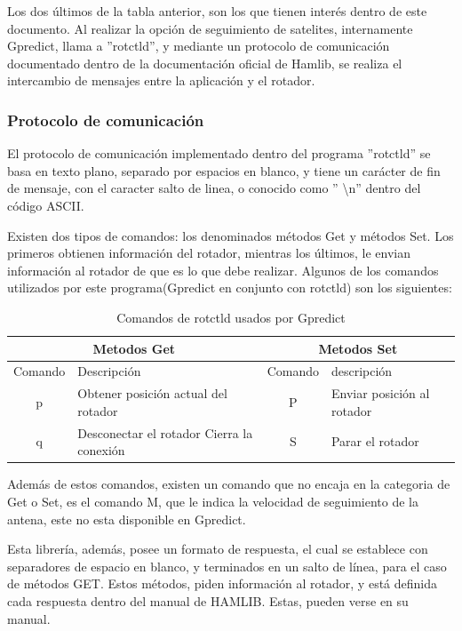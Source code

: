 Los dos últimos de la tabla anterior, son los que tienen interés dentro de este documento. Al realizar la opción de seguimiento de satelites, internamente Gpredict, llama a ''rotctld'', y mediante un protocolo de comunicación documentado dentro de la documentación oficial de Hamlib, se realiza el intercambio de mensajes entre la aplicación y el rotador. 

\subsubsection{Protocolo de comunicación} \label{subsub:protocol_com}
El protocolo de comunicación implementado dentro del programa ''rotctld'' se basa en texto plano, separado por espacios en blanco, y tiene un carácter de fin de mensaje, con el caracter salto de linea, o conocido como '' \textbackslash{}n'' dentro del código ASCII. 

Existen dos tipos de comandos: los denominados métodos Get y métodos Set. Los primeros obtienen información del rotador, mientras los últimos, le envian información al rotador de que es lo que debe realizar. Algunos de los comandos utilizados por este programa(Gpredict en conjunto con rotctld) son los siguientes: 

\begin{table}[H]
	\centering
	\begin{tabular}{|c|p{5cm}|c|p{5cm}|}
		\hline
		\multicolumn{2}{|c|}{Metodos Get}  &  \multicolumn{2}{|c|}{Metodos Set}  \\ 
		\hline
		Comando & Descripción & Comando & descripción	\\
		\hline
		p & Obtener posición actual del rotador  &P& Enviar posición al rotador \\
		\hline 
		q & Desconectar el rotador 	Cierra la conexión & S & Parar el rotador \\ 
		\hline 	
	\end{tabular}
	\caption{Comandos de rotctld usados por Gpredict} 
	\label{tab:commands_Gpredict}
\end{table}

Además de estos comandos, existen un comando que no encaja en la categoria de Get o Set, es el comando M, que le indica la velocidad de seguimiento de la antena, este no esta disponible en Gpredict. 

Esta librería, además, posee un formato de respuesta, el cual se establece con separadores de espacio en blanco, y terminados en un salto de línea, para el caso de métodos GET. Estos métodos, piden información al rotador, y está definida cada respuesta dentro del manual de HAMLIB. Estas, pueden verse en su manual. 

